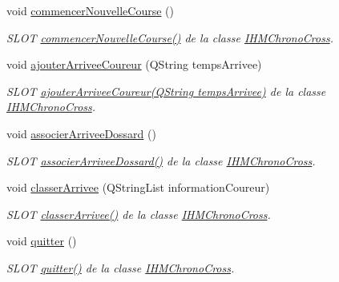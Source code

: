 \begin{DoxyCompactItemize}
void \hyperlink{class_i_h_m_chrono_cross_ab899a1d60c1f853b199abb937ae08e74}{commencer\+Nouvelle\+Course} ()
\begin{DoxyCompactList}\small\item\em S\+L\+OT \hyperlink{class_i_h_m_chrono_cross_ab899a1d60c1f853b199abb937ae08e74}{commencer\+Nouvelle\+Course()} de la classe \hyperlink{class_i_h_m_chrono_cross}{I\+H\+M\+Chrono\+Cross}. \end{DoxyCompactList}\item 
void \hyperlink{class_i_h_m_chrono_cross_a2ce63851d1f2723057ac649b7e320cfe}{ajouter\+Arrivee\+Coureur} (Q\+String temps\+Arrivee)
\begin{DoxyCompactList}\small\item\em S\+L\+OT \hyperlink{class_i_h_m_chrono_cross_a2ce63851d1f2723057ac649b7e320cfe}{ajouter\+Arrivee\+Coureur(\+Q\+String temps\+Arrivee)} de la classe \hyperlink{class_i_h_m_chrono_cross}{I\+H\+M\+Chrono\+Cross}. \end{DoxyCompactList}\item 
void \hyperlink{class_i_h_m_chrono_cross_a9f7f1ad130b60300a879694b6234f161}{associer\+Arrivee\+Dossard} ()
\begin{DoxyCompactList}\small\item\em S\+L\+OT \hyperlink{class_i_h_m_chrono_cross_a9f7f1ad130b60300a879694b6234f161}{associer\+Arrivee\+Dossard()} de la classe \hyperlink{class_i_h_m_chrono_cross}{I\+H\+M\+Chrono\+Cross}. \end{DoxyCompactList}\item 
void \hyperlink{class_i_h_m_chrono_cross_a5e9b561659ba63d2739335b8ab432cbf}{classer\+Arrivee} (Q\+String\+List information\+Coureur)
\begin{DoxyCompactList}\small\item\em S\+L\+OT \hyperlink{class_i_h_m_chrono_cross_a5e9b561659ba63d2739335b8ab432cbf}{classer\+Arrivee()} de la classe \hyperlink{class_i_h_m_chrono_cross}{I\+H\+M\+Chrono\+Cross}. \end{DoxyCompactList}\item 
void \hyperlink{class_i_h_m_chrono_cross_a283c721d31f90031d9a189eafb303b84}{quitter} ()
\begin{DoxyCompactList}\small\item\em S\+L\+OT \hyperlink{class_i_h_m_chrono_cross_a283c721d31f90031d9a189eafb303b84}{quitter()} de la classe \hyperlink{class_i_h_m_chrono_cross}{I\+H\+M\+Chrono\+Cross}. \end{DoxyCompactList}\item 

\end{DoxyCompactItemize}
